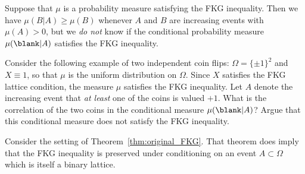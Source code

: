 \begin{remark}
    Suppose that $\mu$ is a probability measure satisfying the FKG inequality.
    Then we have $\mu(B|A)\geq\mu(B)$ whenever $A$ and $B$ are increasing events
    with $\mu(A)>0$,
    but we \emph{do not} know if the conditional probability measure $\mu(\blank|A)$
    satisfies the FKG inequality.
\end{remark}

\begin{exercise}
    Consider the following example of two independent coin flips:
    $\Omega=\{\pm1\}^2$ and $X\equiv 1$,
    so that $\mu$ is the uniform distribution on $\Omega$.
    Since $X$ satisfies the FKG lattice condition,
    the measure $\mu$ satisfies the FKG inequality.
    Let $A$ denote the increasing event that \emph{at least}
    one of the coins is valued $+1$.
    What is the correlation of the two coins in the conditional measure
    $\mu(\blank|A)$?
    Argue that this conditional measure does not satisfy the FKG inequality.
\end{exercise}

\begin{remark}
    Consider the setting of Theorem~\ref{thm:original_FKG}.
    That theorem does imply that the FKG inequality is preserved
    under conditioning on an event $A\subset\Omega$
    which is itself a binary lattice.
\end{remark}
